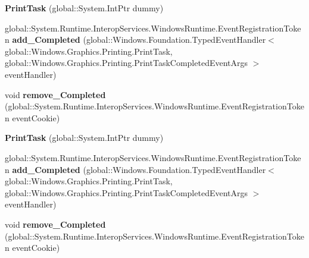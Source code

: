 \begin{DoxyCompactItemize}
\item 
\mbox{\label{class_windows_1_1_graphics_1_1_printing_1_1_print_task_a96a4278842a221de2a49e30404b19e84}} 
{\bfseries Print\+Task} (global\+::\+System.\+Int\+Ptr dummy)
\item 
\mbox{\label{class_windows_1_1_graphics_1_1_printing_1_1_print_task_a017b8b87861dd7ab498c21ff1123c0fe}} 
global\+::\+System.\+Runtime.\+Interop\+Services.\+Windows\+Runtime.\+Event\+Registration\+Token {\bfseries add\+\_\+\+Completed} (global\+::\+Windows.\+Foundation.\+Typed\+Event\+Handler$<$ global\+::\+Windows.\+Graphics.\+Printing.\+Print\+Task, global\+::\+Windows.\+Graphics.\+Printing.\+Print\+Task\+Completed\+Event\+Args $>$ event\+Handler)
\item 
\mbox{\label{class_windows_1_1_graphics_1_1_printing_1_1_print_task_af8b684280a1580c00be6053e72e7badb}} 
void {\bfseries remove\+\_\+\+Completed} (global\+::\+System.\+Runtime.\+Interop\+Services.\+Windows\+Runtime.\+Event\+Registration\+Token event\+Cookie)
\item 
\mbox{\label{class_windows_1_1_graphics_1_1_printing_1_1_print_task_a96a4278842a221de2a49e30404b19e84}} 
{\bfseries Print\+Task} (global\+::\+System.\+Int\+Ptr dummy)
\item 
\mbox{\label{class_windows_1_1_graphics_1_1_printing_1_1_print_task_a017b8b87861dd7ab498c21ff1123c0fe}} 
global\+::\+System.\+Runtime.\+Interop\+Services.\+Windows\+Runtime.\+Event\+Registration\+Token {\bfseries add\+\_\+\+Completed} (global\+::\+Windows.\+Foundation.\+Typed\+Event\+Handler$<$ global\+::\+Windows.\+Graphics.\+Printing.\+Print\+Task, global\+::\+Windows.\+Graphics.\+Printing.\+Print\+Task\+Completed\+Event\+Args $>$ event\+Handler)
\item 
\mbox{\label{class_windows_1_1_graphics_1_1_printing_1_1_print_task_af8b684280a1580c00be6053e72e7badb}} 
void {\bfseries remove\+\_\+\+Completed} (global\+::\+System.\+Runtime.\+Interop\+Services.\+Windows\+Runtime.\+Event\+Registration\+Token event\+Cookie)

\end{DoxyCompactItemize}

